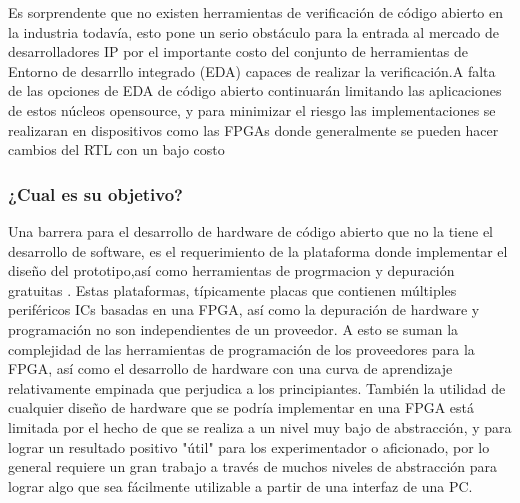 \documentclass[a4paper,11pt]{article}
\begin{document}
Es sorprendente que no existen herramientas de verificación de código abierto en la industria todavía, esto pone un serio obstáculo para la entrada al mercado de desarrolladores IP por el importante costo del conjunto de herramientas de Entorno de desarrllo integrado (EDA) capaces de realizar la verificación.A falta de las opciones de EDA de código abierto continuarán limitando las aplicaciones de estos núcleos opensource, y para minimizar el riesgo las implementaciones se realizaran en dispositivos como las FPGAs donde generalmente se pueden hacer cambios  del RTL con un bajo costo 
 

\subsubsection{¿Cual es su objetivo? }


Una barrera para el desarrollo de hardware de código abierto que no la tiene el desarrollo de software, es el requerimiento de la plataforma donde implementar el diseño del prototipo,así como herramientas  de progrmacion y depuración gratuitas . Estas plataformas, típicamente placas que contienen múltiples periféricos ICs basadas en una FPGA, así como la depuración de hardware y programación no son independientes de un proveedor. A esto se suman la complejidad de las herramientas de programación de los proveedores para la FPGA, así como el desarrollo de hardware con una curva de aprendizaje relativamente empinada que perjudica a los principiantes.
También  la utilidad de cualquier diseño de hardware que se podría implementar en una FPGA está limitada por el hecho de que se realiza a un nivel muy bajo de abstracción, y para lograr un resultado positivo "útil" para los experimentador o aficionado, por lo general requiere un gran trabajo a través de muchos niveles de abstracción para lograr algo que sea fácilmente utilizable a partir de una interfaz de una PC. 
\end{document}
